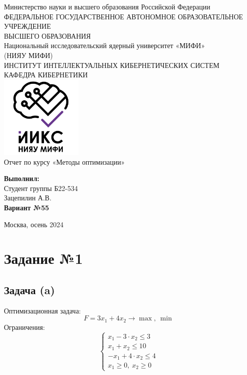 \documentclass{article}
\begin{document}
\begin{titlepage}
    \centering
    {\large Министерство науки и высшего образования Российской Федерации\\[0.5cm]}
    {\Large ФЕДЕРАЛЬНОЕ ГОСУДАРСТВЕННОЕ АВТОНОМНОЕ ОБРАЗОВАТЕЛЬНОЕ УЧРЕЖДЕНИЕ\\
        ВЫСШЕГО ОБРАЗОВАНИЯ}\\[0.5cm]
    {\Large Национальный исследовательский ядерный университет «МИФИ»\\
    (НИЯУ МИФИ)}\\[1cm]
    {\large ИНСТИТУТ ИНТЕЛЛЕКТУАЛЬНЫХ КИБЕРНЕТИЧЕСКИХ СИСТЕМ\\
    КАФЕДРА КИБЕРНЕТИКИ}\\[1cm]
    \includegraphics[width=0.3\textwidth]{IIKS.png}\\[1.5cm] %
    {\huge Отчет по курсу «Методы оптимизации»}\\[5cm]

    \begin{flushright}
        \textbf{Выполнил:}\\
        Студент группы Б22-534\\
        Зацепилин А.В.\\[0.5cm]
        \textbf{Вариант №55}
    \end{flushright}

    \vfill
    Москва, осень 2024
\end{titlepage}

\tableofcontents
\newpage

\section{Задание №1}

\subsection{Задача (a)}

Оптимизационная задача:
\[
    F = 3x_1 + 4x_2 \to \max, \ \min
\]
Ограничения:
\[
    \begin{cases}
        x_1 - 3 \cdot x_2 \leq 3  \\
        x_1 + x_2 \leq 10         \\
        -x_1 + 4 \cdot x_2 \leq 4 \\
        x_1 \geq 0, \ x_2 \geq 0
    \end{cases}
\]
\end{document}
